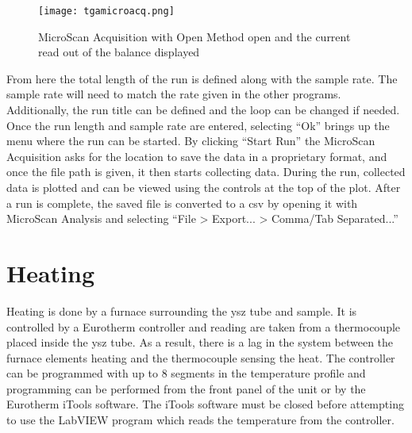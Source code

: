         \begin{figure}
            \begin{center}
            \texttt{[image: tgamicroacq.png]}
            \end{center}
            \caption{MicroScan Acquisition with Open Method open and the current read out of the balance displayed}
            \label{fig:tgamicroaq}
        \end{figure}

        From here the total length of the run is defined along with the sample rate.
        The sample rate will need to match the rate given in the other programs.
        Additionally, the run title can be defined and the loop can be changed if needed.
        Once the run length and sample rate are entered, selecting ``Ok'' brings up the menu where the run can be started.
        By clicking ``Start Run'' the MicroScan Acquisition asks for the location to save the data in a proprietary format, and once the file path is given, it then starts collecting data.
        During the run, collected data is plotted and can be viewed using the controls at the top of the plot.
        After a run is complete, the saved file is converted to a csv by opening it with MicroScan Analysis and selecting ``File \textgreater{} Export... \textgreater{} Comma/Tab Separated...''

\section{Heating}
    Heating is done by a furnace surrounding the \gls{ysz} tube and sample.
    It is controlled by a Eurotherm controller and reading are taken from a thermocouple placed inside the \gls{ysz} tube.
    As a result, there is a lag in the system between the furnace elements heating and the thermocouple sensing the heat.
    The controller can be programmed with up to 8 segments in the temperature profile and programming can be performed from the front panel of the unit or by the Eurotherm iTools software.
    The iTools software must be closed before attempting to use the LabVIEW program which reads the temperature from the controller.

